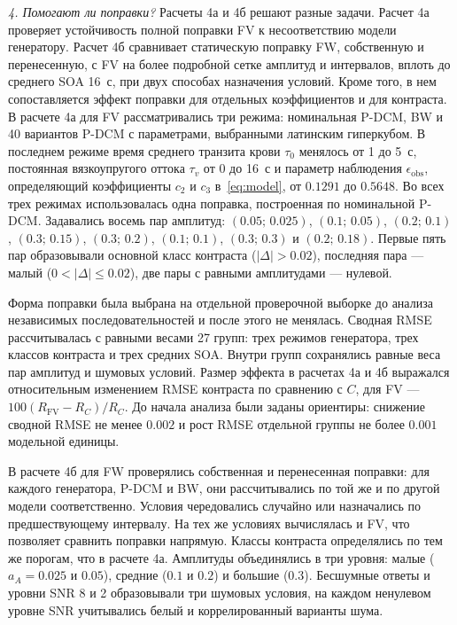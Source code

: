 \textit{4. Помогают ли поправки?} Расчеты 4а и 4б решают разные задачи. Расчет 4а проверяет устойчивость полной поправки FV к несоответствию модели генератору. Расчет 4б сравнивает статическую поправку FW, собственную и перенесенную, с FV на более подробной сетке амплитуд и интервалов, вплоть до среднего SOA 16~с, при двух способах назначения условий. Кроме того, в нем сопоставляется эффект поправки для отдельных коэффициентов и для контраста. В расчете 4а для FV рассматривались три режима: номинальная P-DCM, BW и 40 вариантов P-DCM с параметрами, выбранными латинским гиперкубом. В последнем режиме время среднего транзита крови $\tau_0$ менялось от 1 до 5~с, постоянная вязкоупругого оттока $\tau_v$ от 0 до 16~с и параметр наблюдения $\epsilon_{\mathrm{obs}}$, определяющий коэффициенты $c_2$ и $c_3$ в~\eqref{eq:model}, от $0.1291$ до $0.5648$. Во всех трех режимах использовалась одна поправка, построенная по номинальной P-DCM. Задавались восемь пар амплитуд: $(0.05;\,0.025)$, $(0.1;\,0.05)$, $(0.2;\,0.1)$, $(0.3;\,0.15)$, $(0.3;\,0.2)$, $(0.1;\,0.1)$, $(0.3;\,0.3)$ и $(0.2;\,0.18)$. Первые пять пар образовывали основной класс контраста ($|\Delta|>0.02$), последняя пара --- малый ($0<|\Delta|\le0.02$), две пары с равными амплитудами --- нулевой.

Форма поправки была выбрана на отдельной проверочной выборке до анализа независимых последовательностей и после этого не менялась. Сводная RMSE рассчитывалась с равными весами 27 групп: трех режимов генератора, трех классов контраста и трех средних SOA. Внутри групп сохранялись равные веса пар амплитуд и шумовых условий. Размер эффекта в расчетах 4а и 4б выражался относительным изменением RMSE контраста по сравнению с $C$, для FV --- $100(R_{\mathrm{FV}}-R_C)/R_C$. До начала анализа были заданы ориентиры: снижение сводной RMSE не менее $0.002$ и рост RMSE отдельной группы не более $0.001$ модельной единицы.

В расчете 4б для FW проверялись собственная и перенесенная поправки: для каждого генератора, P-DCM и BW, они рассчитывались по той же и по другой модели соответственно. Условия чередовались случайно или назначались по предшествующему интервалу. На тех же условиях вычислялась и FV, что позволяет сравнить поправки напрямую. Классы контраста определялись по тем же порогам, что в расчете 4а. Амплитуды объединялись в три уровня: малые ($a_A=0.025$ и $0.05$), средние ($0.1$ и $0.2$) и большие ($0.3$). Бесшумные ответы и уровни SNR 8 и 2 образовывали три шумовых условия, на каждом ненулевом уровне SNR учитывались белый и коррелированный варианты шума.

